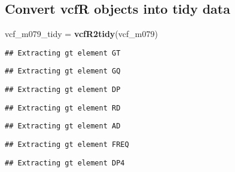 \documentclass[]{article}
\newenvironment{Shaded}{\begin{snugshade}}{\end{snugshade}}
\newcommand{\KeywordTok}[1]{\textcolor[rgb]{0.13,0.29,0.53}{\textbf{#1}}}
\newcommand{\NormalTok}[1]{#1}
\newcommand{\OperatorTok}[1]{\textcolor[rgb]{0.81,0.36,0.00}{\textbf{#1}}}
\newcommand{\StringTok}[1]{\textcolor[rgb]{0.31,0.60,0.02}{#1}}
\begin{document}
\hypertarget{convert-vcfr-objects-into-tidy-data}{%
\subsection{Convert vcfR objects into tidy
data}\label{convert-vcfr-objects-into-tidy-data}}

\begin{Shaded}
\begin{Highlighting}[]
\NormalTok{vcf_m079_tidy =}\StringTok{ }\KeywordTok{vcfR2tidy}\NormalTok{(vcf_m079)}
\end{Highlighting}
\end{Shaded}

\begin{verbatim}
## Extracting gt element GT
\end{verbatim}

\begin{verbatim}
## Extracting gt element GQ
\end{verbatim}

\begin{verbatim}
## Extracting gt element DP
\end{verbatim}

\begin{verbatim}
## Extracting gt element RD
\end{verbatim}

\begin{verbatim}
## Extracting gt element AD
\end{verbatim}

\begin{verbatim}
## Extracting gt element FREQ
\end{verbatim}

\begin{verbatim}
## Extracting gt element DP4
\end{verbatim}

\begin{Shaded}
\end{Shaded}
\end{document}
